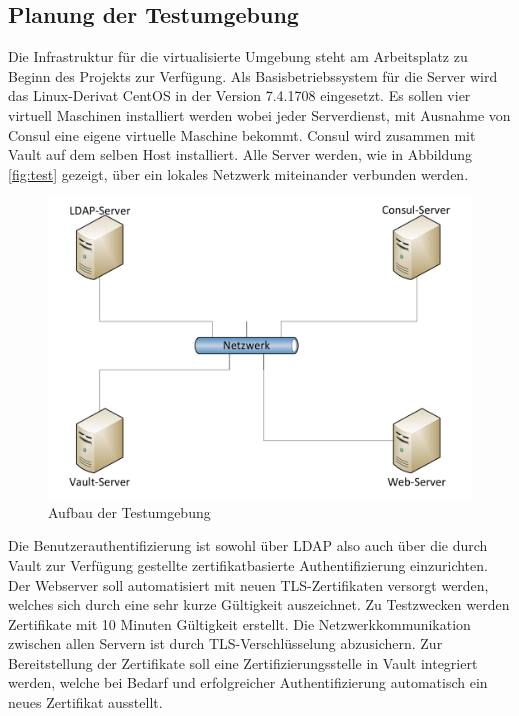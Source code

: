 \documentclass[
book,
a4paper,   
titlepage,  
halfparskip,
12pt        
]{scrartcl}
\begin{document}
\begin{onehalfspacing}
\subsection{Planung der Testumgebung}
\label{subsec:plan}
Die Infrastruktur für die virtualisierte Umgebung steht am Arbeitsplatz zu Beginn des Projekts zur Verfügung. Als Basisbetriebssystem für die Server wird das Linux-Derivat CentOS in der Version 7.4.1708 eingesetzt. Es sollen vier virtuell Maschinen installiert werden wobei jeder Serverdienst, mit Ausnahme von Consul eine eigene virtuelle Maschine bekommt. Consul wird zusammen mit Vault auf dem selben Host installiert. Alle Server werden, wie in Abbildung \vref{fig:test} gezeigt, über ein lokales Netzwerk miteinander verbunden werden.\newline

\begin{figure}[h]
	\centering
	\includegraphics[width=1\linewidth]{plan}
	\caption[Netzplan]{Aufbau der Testumgebung}
	\label{fig:test}
\end{figure}

Die Benutzerauthentifizierung ist sowohl über \ac{LDAP} also auch über die durch Vault zur Verfügung gestellte zertifikatbasierte Authentifizierung einzurichten. Der Webserver soll automatisiert mit neuen \ac{TLS}-Zertifikaten versorgt werden, welches sich durch eine sehr kurze Gültigkeit auszeichnet. Zu Testzwecken werden Zertifikate mit 10 Minuten Gültigkeit erstellt. Die Netzwerkkommunikation zwischen allen Servern ist durch \ac{TLS}-Verschlüsselung abzusichern. Zur Bereitstellung der Zertifikate soll eine Zertifizierungsstelle in Vault integriert werden, welche bei Bedarf und erfolgreicher Authentifizierung automatisch ein neues Zertifikat ausstellt. 

\end{onehalfspacing}
\end{document}
